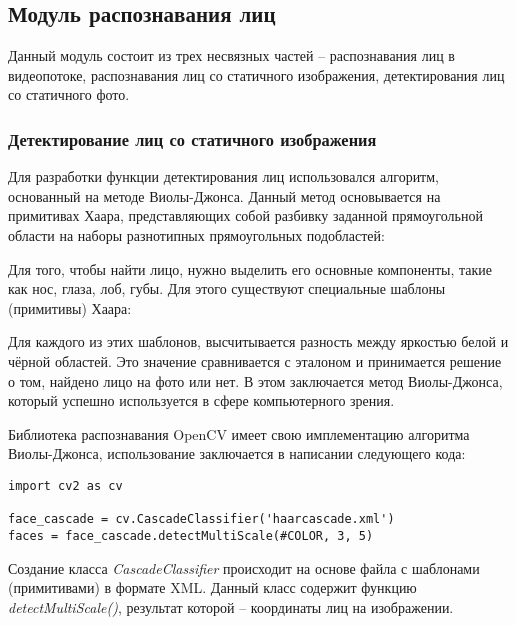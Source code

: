 \subsection{Модуль распознавания лиц}

Данный модуль состоит из трех несвязных частей -- распознавания лиц
в видеопотоке, распознавания лиц со статичного изображения, детектирования лиц
со статичного фото.

\subsubsection{Детектирование лиц со статичного изображения}

Для разработки функции детектирования лиц использовался алгоритм, основанный на
методе Виолы-Джонса. Данный метод основывается на примитивах Хаара,
представляющих собой разбивку заданной прямоугольной области на наборы
разнотипных прямоугольных подобластей:


Для того, чтобы найти лицо, нужно выделить его основные компоненты, такие как
нос, глаза, лоб, губы. Для этого существуют специальные шаблоны (примитивы)
Хаара:


Для каждого из этих шаблонов, высчитывается разность между яркостью белой
и чёрной областей. Это значение сравнивается с эталоном и принимается решение
о том, найдено лицо на фото или нет. В этом заключается метод Виолы-Джонса,
который успешно используется в сфере компьютерного зрения.


Библиотека распознавания OpenCV имеет свою имплементацию алгоритма
Виолы-Джонса, использование заключается в написании следующего кода:

\lstset{language=Python, basicstyle=\normalsize, numbers=left, breaklines=true,
frame=single, showstringspaces=false, columns=fullflexible} 
\begin{lstlisting}
import cv2 as cv

face_cascade = cv.CascadeClassifier('haarcascade.xml')
faces = face_cascade.detectMultiScale(#COLOR, 3, 5)
\end{lstlisting}

Создание класса \textit{CascadeClassifier} происходит на основе файла с шаблонами
(примитивами) в формате XML. Данный класс содержит функцию
\textit{detectMultiScale()}, результат которой -- координаты лиц на
изображении.
